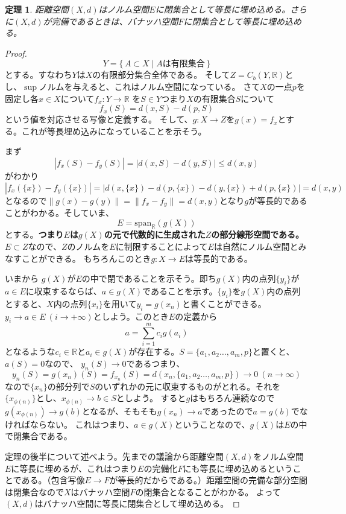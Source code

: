 \documentclass[leqno]{jsarticle}
\newtheorem{thm}{定理}
\newcommand{\rr}{\mathbb{R}}
\newcommand{\mgn}{\infty}
\begin{document}
\begin{thm}\label{n}
距離空間$(X,d)$はノルム空間$E$に閉集合として等長に埋め込める。さらに$(X,d)$が完備であるときは、バナッハ空間$F$に閉集合として等長に埋め込める。
\end{thm}
\begin{proof}
\[
Y=\{\,A\subset X\mid \text{$A$は有限集合}\,\}
\]
とする。すなわち$Y$は$X$の有限部分集合全体である。
そして$Z=C_b(Y,\rr)$とし、$\sup$ノルムを与えると、これはノルム空間になっている。
さて$X$の一点$p$を固定し各$x\in X$について$f_x:Y\to \rr$
を$S\in Y$つまり$X$の有限集合$S$について
\[
f_x(S)=d(x,S)-d(p,S)
\]
という値を対応させる写像と定義する。
そして、$g:X\to Z$を$g(x)=f_x$とする。これが等長埋め込みになっていることを示そう。
\par
まず
\[
|f_x(S)-f_y(S)|=|d(x,S)-d(y,S)|\le d(x,y)
\]
がわかり
\[
|f_x(\{x\})-f_y(\{x\})|=|d(x,\{x\})-d(p,\{x\})-d(y,\{x\})+d(p,\{x\})|=d(x,y)
\]
となるので$\|g(x)-g(y)\|=\|f_x-f_y\|=d(x,y)$となり$g$が等長的であることがわかる。そしていま、
\[
E=\textrm{span}_{\rr}(g(X))
\]
とする。\textbf{つまり$E$は$g(X)$の元で代数的に生成された$Z$の部分線形空間である。}
$E\subset Z$なので、$Z$のノルムを$E$に制限することによって$E$は自然にノルム空間とみなすことができる。
もちろんこのとき$g:X\to E$は等長的である。
\par
いまから
$g(X)$が$E$の中で閉であることを示そう。即ち$g(X)$内の点列$\{y_i\}$が$a\in E$に収束するならば、$a\in g(X)$であることを示す。$\{y_i\}$を$g(X)$内の点列とすると、$X$内の点列$\{x_i\}$を用いて$y_i=g(x_n)$と書くことができる。
$y_i\to a\in E\ (i\to +\mgn)$としよう。このとき$E$の定義から
\[
a=\sum_{i=1}^mc_ig(a_i)
\]
となるような$c_i\in \rr$と$a_i\in g(X)$が存在する。$S=\{a_1,a_2\dots, a_m,p\}$と置くと、$a(S)=0$なので、
$y_n(S)\to 0$であるつまり、
\[
y_n(S)=g(x_n)(S)=f_{x_n}(S)=d(x_n, \{a_1,a_2\dots, a_m,p\})\to 0\ (n\to \mgn)
\]
なので$\{x_n\}$の部分列で$S$のいずれかの元に収束するものがとれる。それを$\{x_{\phi(n)}\}$とし、$x_{\phi(n)}\to b\in S$としよう。
すると$g$はもちろん連続なので$g(x_{\phi(n)})\to g(b)$となるが、そもそも$g(x_n)\to a$であったので$a=g(b)$でなければならない。
これはつまり、$a\in g(X)$ということなので、$g(X)$は$E$の中で閉集合である。
\par
定理の後半について述べよう。先までの議論から距離空間$(X,d)$をノルム空間$E$に等長に埋めるが、これはつまり$E$の完備化$F$にも等長に埋め込めるということである。（包含写像$E\to F$が等長的だからである。）距離空間の完備な部分空間は閉集合なので$X$はバナッハ空間$F$の閉集合となることがわかる。
よって$(X,d)$はバナッハ空間に等長に閉集合として埋め込める。
\end{proof}
\end{document}

